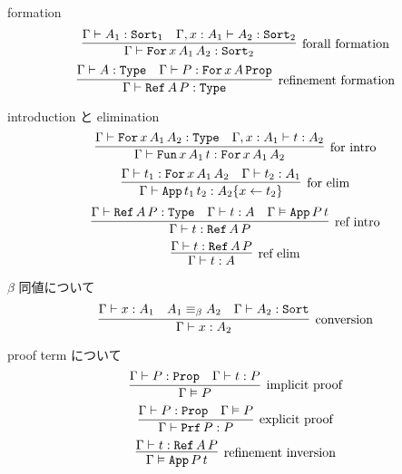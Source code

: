 \begin{itembox}[l]{formation}
  \[\infer[\text{forall formation}]{\Gamma \vdash \texttt{For} \, x \, A_1 \, A_2 : \texttt{Sort}_2}{\Gamma \vdash A_1 : \texttt{Sort}_1 & \Gamma , x : A_1 \vdash A_2 : \texttt{Sort}_2 }\]
  \[\infer[\text{refinement formation}]{\Gamma \vdash \texttt{Ref} \, A \, P : \texttt{Type}}{\Gamma \vdash A : \texttt{Type} & \Gamma \vdash P : \texttt{For} \, x \, A \, \texttt{Prop}}\]
\end{itembox}

\begin{itembox}[l]{introduction と elimination}
  \[\infer[\text{for intro}]{\Gamma \vdash \texttt{Fun} \, x \, A_1 \, t : \texttt{For} \, x \, A_1 \, A_2}{\Gamma \vdash \texttt{For} \, x \, A_1 \, A_2 : \texttt{Type} & \Gamma , x : A_1 \vdash t : A_2} \]
  \[\infer[\text{for elim}]{\Gamma \vdash \texttt{App} \, t_1 \, t_2 : A_2\{x \leftarrow t_2\}}{\Gamma \vdash t_1 : \texttt{For} \, x \, A_1 \, A_2 & \Gamma \vdash t_2 : A_1} \]
  \[\infer[\text{ref intro}]{\Gamma \vdash t : \texttt{Ref} \, A \, P}{\Gamma \vdash \texttt{Ref} \, A \, P : \texttt{Type} & \Gamma \vdash t : A & \Gamma \vDash \texttt{App} \, P \, t} \]
  \[\infer[\text{ref elim}]{\Gamma \vdash t : A}{\Gamma \vdash t : \texttt{Ref} \, A \, P} \]
\end{itembox}

\begin{itembox}[l]{\(\beta\) 同値について}
  \[\infer[\text{conversion}]{\Gamma \vdash x : A_2}{\Gamma \vdash x : A_1 & A_1 \equiv_{\beta} A_2 & \Gamma \vdash A_2 : \texttt{Sort}} \]
\end{itembox}

\begin{itembox}[l]{proof term について}
  \[\infer[\text{implicit proof}]{\Gamma \vDash P}{\Gamma \vdash P : \texttt{Prop} & \Gamma \vdash t : P} \]
  \[\infer[\text{explicit proof}]{\Gamma \vdash \texttt{Prf} \, P : P}{\Gamma \vdash P : \texttt{Prop} &\Gamma \vDash P} \]
  \[\infer[\text{refinement inversion}]{\Gamma \vDash \texttt{App} \, P \, t}{\Gamma \vdash t : \texttt{Ref} \, A \, P}\]
\end{itembox}